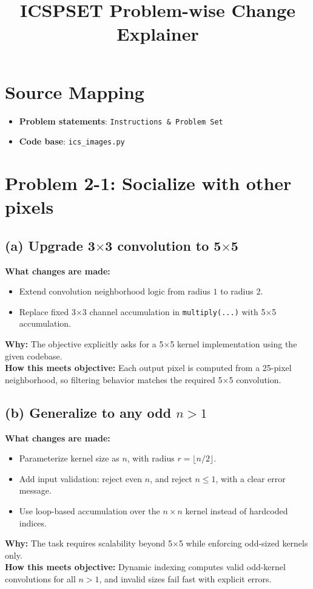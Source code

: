 \documentclass[11pt]{article}
\title{ICSPSET Problem-wise Change Explainer}
\author{}
\date{}
\begin{document}
\maketitle

\section*{Source Mapping}
\begin{itemize}[leftmargin=1.2em]
    \item \textbf{Problem statements}: \texttt{Instructions \& Problem Set}
    \item \textbf{Code base}: \texttt{ics\_images.py}
\end{itemize}

\section*{Problem 2-1: Socialize with other pixels}
\subsection*{(a) Upgrade 3\(\times\)3 convolution to 5\(\times\)5}
\textbf{What changes are made:}
\begin{itemize}[leftmargin=1.2em]
    \item Extend convolution neighborhood logic from radius \(1\) to radius \(2\).
    \item Replace fixed 3\(\times\)3 channel accumulation in \texttt{multiply(...)} with 5\(\times\)5 accumulation.
\end{itemize}
\textbf{Why:} The objective explicitly asks for a 5\(\times\)5 kernel implementation using the given codebase.\\
\textbf{How this meets objective:} Each output pixel is computed from a 25-pixel neighborhood, so filtering behavior matches the required 5\(\times\)5 convolution.

\subsection*{(b) Generalize to any odd \(n>1\)}
\textbf{What changes are made:}
\begin{itemize}[leftmargin=1.2em]
    \item Parameterize kernel size as \(n\), with radius \(r=\lfloor n/2 \rfloor\).
    \item Add input validation: reject even \(n\), and reject \(n \le 1\), with a clear error message.
    \item Use loop-based accumulation over the \(n \times n\) kernel instead of hardcoded indices.
\end{itemize}
\textbf{Why:} The task requires scalability beyond 5\(\times\)5 while enforcing odd-sized kernels only.\\
\textbf{How this meets objective:} Dynamic indexing computes valid odd-kernel convolutions for all \(n>1\), and invalid sizes fail fast with explicit errors.
\end{document}
